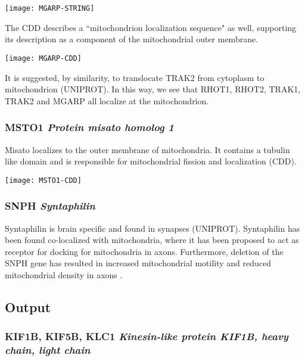 \begin{center}
  \texttt{[image: MGARP-STRING]}
\end{center}

The CDD describes a ``mitochondrion localization sequence" as well, supporting
its description as a component of the mitochondrial outer membrane.

\begin{center}
  \texttt{[image: MGARP-CDD]}
\end{center}

It is suggested, by similarity, to translocate TRAK2 from cytoplasm to
mitochondrion (UNIPROT). In this way, we see that RHOT1, RHOT2, TRAK1, TRAK2 and
MGARP all localize at the mitochondrion.

\subsubsection{MSTO1 \textit{Protein misato homolog 1}}

Misato localizes to the outer membrane of mitochondria. It contains a tubulin
like domain and is responsible for mitochondrial fission and localization (CDD).

\begin{center}
  \texttt{[image: MSTO1-CDD]}
\end{center}

\subsubsection{SNPH \textit{Syntaphilin}}

Syntaphilin is brain specific and found in synapses (UNIPROT). Syntaphilin
has been found co-localized with mitochondria, where it has been proposed
to act as receptor for docking for mitochondria in axons. Furthermore, deletion
of the SNPH gene has resulted in increased mitochondrial motility and reduced
mitochondrial density in axons \citep{Reis2009}.

\subsection{Output}

\subsubsection{KIF1B, KIF5B, KLC1 \textit{Kinesin-like protein KIF1B, heavy chain, light chain}}

